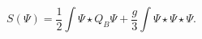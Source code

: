 \begin{equation}\label{eq:WittenAction}
  S(\Psi)  = \frac{1}{2}\int \Psi \star Q_B \Psi 
            +\frac{g}{3} \int \Psi \star \Psi\star \Psi.
\end{equation}

